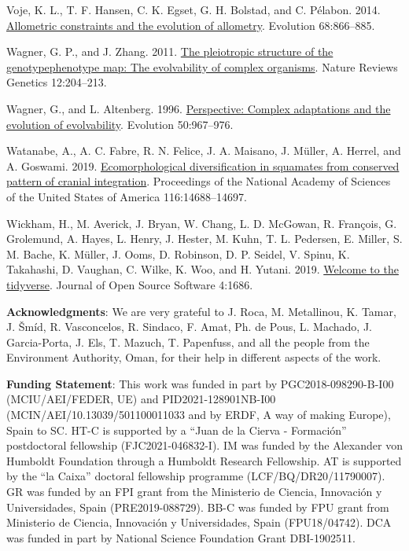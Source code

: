 \documentclass[
  11pt,
]{article}
\newlength{\cslhangindent}
\newlength{\cslentryspacingunit} %
\newenvironment{CSLReferences}[2] %
 {%
  \setlength{\parindent}{0pt}
  \ifodd #1
  \let\oldpar\par
  \def\par{\hangindent=\cslhangindent\oldpar}
  \fi
  \setlength{\parskip}{#2\cslentryspacingunit}
 }%
 {}
\begin{document}
\begin{CSLReferences}{1}{0}
\leavevmode{}%
Voje, K. L., T. F. Hansen, C. K. Egset, G. H. Bolstad, and C. Pélabon.
2014. \href{https://doi.org/10.1111/evo.12312}{Allometric constraints
and the evolution of allometry}. Evolution 68:866--885.

\leavevmode{}%
Wagner, G. P., and J. Zhang. 2011.
\href{https://doi.org/10.1038/nrg2949}{The pleiotropic structure of the
genotype{\textendash}phenotype map: The evolvability of complex
organisms}. Nature Reviews Genetics 12:204--213.

\leavevmode{}%
Wagner, G., and L. Altenberg. 1996.
\href{https://doi.org/10.1111/j.1558-5646.1996.tb02339.x}{Perspective:
Complex adaptations and the evolution of evolvability}. Evolution
50:967--976.

\leavevmode{}%
Watanabe, A., A. C. Fabre, R. N. Felice, J. A. Maisano, J. Müller, A.
Herrel, and A. Goswami. 2019.
\href{https://doi.org/10.1073/pnas.1820967116}{{Ecomorphological
diversification in squamates from conserved pattern of cranial
integration}}. Proceedings of the National Academy of Sciences of the
United States of America 116:14688--14697.

\leavevmode{}%
Wickham, H., M. Averick, J. Bryan, W. Chang, L. D. McGowan, R. François,
G. Grolemund, A. Hayes, L. Henry, J. Hester, M. Kuhn, T. L. Pedersen, E.
Miller, S. M. Bache, K. Müller, J. Ooms, D. Robinson, D. P. Seidel, V.
Spinu, K. Takahashi, D. Vaughan, C. Wilke, K. Woo, and H. Yutani. 2019.
\href{https://doi.org/10.21105/joss.01686}{Welcome to the {tidyverse}}.
Journal of Open Source Software 4:1686.

\end{CSLReferences}

\newpage

\hfill\break

\textbf{Acknowledgments}: We are very grateful to J. Roca, M.
Metallinou, K. Tamar, J. Šmíd, R. Vasconcelos, R. Sindaco, F. Amat, Ph.
de Pous, L. Machado, J. Garcia-Porta, J. Els, T. Mazuch, T. Papenfuss,
and all the people from the Environment Authority, Oman, for their help
in different aspects of the work.

\textbf{Funding Statement}: This work was funded in part by
PGC2018-098290-B-I00 (MCIU/AEI/FEDER, UE) and PID2021-128901NB-I00
(MCIN/AEI/10.13039/501100011033 and by ERDF, A way of making Europe),
Spain to SC. HT-C is supported by a ``Juan de la Cierva - Formación''
postdoctoral fellowship (FJC2021-046832-I). IM was funded by the
Alexander von Humboldt Foundation through a Humboldt Research
Fellowship. AT is supported by the ``la Caixa'' doctoral fellowship
programme (LCF/BQ/DR20/11790007). GR was funded by an FPI grant from the
Ministerio de Ciencia, Innovación y Universidades, Spain
(PRE2019-088729). BB-C was funded by FPU grant from Ministerio de
Ciencia, Innovación y Universidades, Spain (FPU18/04742). DCA was funded
in part by National Science Foundation Grant DBI-1902511.
\end{document}
